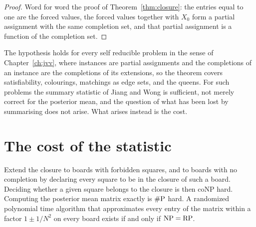 \begin{proof}
Word for word the proof of Theorem~\ref{thm:closure}: the entries equal to one are the forced values, the forced values together with $X_0$ form a partial assignment with the same completion set, and that partial assignment is a function of the completion set.
\end{proof}

The hypothesis holds for every self reducible problem in the sense of Chapter~\ref{ch:jvv}, where instances are partial assignments and the completions of an instance are the completions of its extensions, so the theorem covers satisfiability, colourings, matchings as edge sets, and the queens. For such problems the summary statistic of Jiang and Wong is sufficient, not merely correct for the posterior mean, and the question of what has been lost by summarising does not arise. What arises instead is the cost.

\section{The cost of the statistic}

\begin{theorem}
\label{thm:cost}
Extend the closure to boards with forbidden squares, and to boards with no completion by declaring every square to be in the closure of such a board. Deciding whether a given square belongs to the closure is then $\mathrm{coNP}$ hard. Computing the posterior mean matrix exactly is $\#\mathrm{P}$ hard. A randomized polynomial time algorithm that approximates every entry of the matrix within a factor $1 \pm 1/N^2$ on every board exists if and only if $\mathrm{NP} = \mathrm{RP}$.
\end{theorem}

